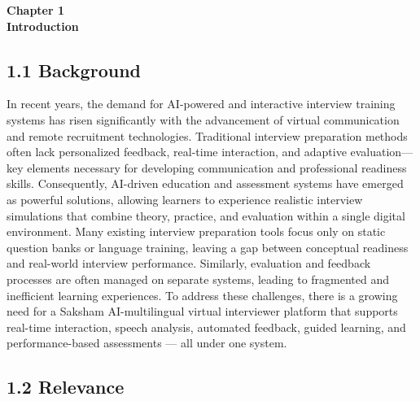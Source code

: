 \documentclass[12pt]{article}
\begin{document}
\vspace*{\fill}
\begin{center}
    {\Large \bfseries Chapter 1} \\[2em]
    {\Large \bfseries Introduction}
\end{center}
\vspace*{\fill}
\newpage %


\subsection{1.1 Background}

\vspace{10pt}

  \noindent In recent years, the demand for AI-powered and interactive interview training systems has risen significantly with the advancement of virtual communication and remote recruitment technologies. Traditional interview preparation methods often lack personalized feedback, real-time interaction, and adaptive evaluation—key elements necessary for developing communication and professional readiness skills. Consequently, AI-driven education and assessment systems have emerged as powerful solutions, allowing learners to experience realistic interview simulations that combine theory, practice, and evaluation within a single digital environment. Many existing interview preparation tools focus only on static question banks or language training, leaving a gap between conceptual readiness and real-world interview performance. Similarly, evaluation and feedback processes are often managed on separate systems, leading to fragmented and inefficient learning experiences. To address these challenges, there is a growing need for a Saksham AI-multilingual virtual interviewer platform that supports real-time interaction, speech analysis, automated feedback, guided learning, and performance-based assessments — all under one system.
  
\subsection{1.2 Relevance}
\vspace{10pt}
\end{document}
